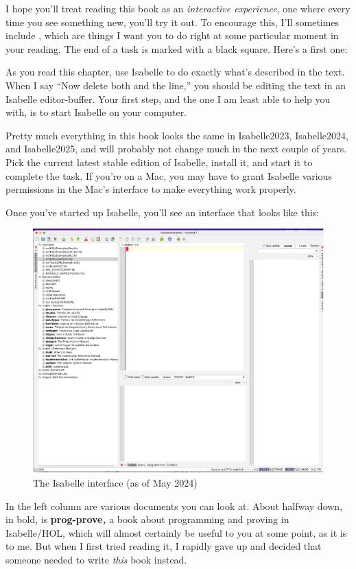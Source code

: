 I hope you'll treat reading this book as an \emph{interactive experience}, one where every time you see something new, you'll try it out. To encourage this, I'll sometimes include , which are things I want you to do right at some particular moment in your reading. The end of a task is marked with a black square. Here's a first one:

\task
As you read this chapter, use Isabelle to do exactly what's described in the text. When I say ``Now delete both  and the  line,'' you should be editing the text in an Isabelle editor-buffer. Your first step, and the one I am least able to help you with, is to start Isabelle on your computer. 
\etask

Pretty much everything in this book looks the same in Isabelle2023, Isabelle2024, and Isabelle2025, and will probably not change much in the next couple of years. Pick the current latest stable edition of Isabelle, install it, and start it to complete the task. If you're on a Mac, you may have to grant Isabelle various permissions in the Mac's interface to make everything work properly. 

Once you've started up Isabelle, you'll see an interface that looks like this:
\begin{figure}[h]
    \centering
    \includegraphics[width=0.7\linewidth]{C01//Images/interface.png}
    \caption{The Isabelle interface (as of May 2024)}
    \label{fig:C1-interface}
\end{figure}
In the left column are various documents you can look at. About halfway down, in bold, is \textbf{prog-prove}\textit{\textbf{,}} a book about programming and proving in Isabelle/HOL, which will almost certainly be useful to you at some point, as it is to me. But when I first tried reading it, I rapidly gave up and decided that someone needed to write \textit{this} book instead. 

